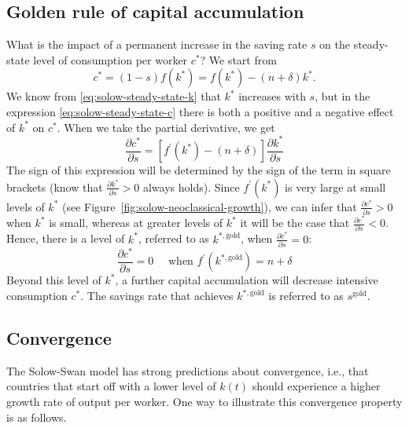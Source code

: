 \documentclass[\topdir/lecture\_notes.tex]{subfiles}
\begin{document}
\subsection{Golden rule of capital accumulation}
What is the impact of a permanent increase in the saving rate \(s\) on the steady-state level of consumption per worker \(c^{*}\)? We start from
\begin{equation}
  c^{*}=(1-s) f\left(k^{*}\right)=f\left(k^{*}\right)-(n+\delta) k^{*}. \label{eq:solow-steady-state-c}
\end{equation}
We know from \eqref{eq:solow-steady-state-k} that \(k^{*}\) increases with \(s\), but in the expression \eqref{eq:solow-steady-state-c} there is both a positive and a negative effect of \(k^{*}\) on \(c^{*}\).
When we take the partial derivative, we get
\begin{equation}
  \frac{\partial c^{*}}{\partial s}=\left[f^{\prime}\left(k^{*}\right)-(n+\delta)\right] \frac{\partial k^{*}}{\partial s} \label{eq:solow-c-derivative}
\end{equation}
The sign of this expression will be determined by the sign of the term in square brackets (know that \(\frac{\partial k^{*}}{\partial s}>0\) always holds).
Since \(f^{\prime}\left(k^{*}\right)\) is very large at small levels of \(k^{*}\) (see Figure~\ref{fig:solow-neoclassical-growth}), we can infer that \(\frac{\partial c^{*}}{\partial s}>0\) when \(k^{*}\) is small, whereas at greater levels of \(k^{*}\) it will be the case that \(\frac{\partial c^{*}}{\partial s}<0\).
Hence, there is a level of \(k^{*}\), referred to as \(k^{*, \text{gold}}\), when \(\frac{\partial c^{*}}{\partial s}=0\):
\begin{equation}
  \frac{\partial c^{*}}{\partial s}=0 \quad \text { when } f^{\prime}\left(k^{*, \text{gold}}\right)=n+\delta
  \label{eq:solow-golden-rule}
\end{equation}
Beyond this level of \(k^{*}\), a further capital accumulation will decrease intensive consumption \(c^{*}\).
The savings rate that achieves \(k^{*, \text{gold}}\) is referred to as \(s^{\text{gold}}\).

\subsection{Convergence}
The Solow-Swan model has strong predictions about convergence, i.e., that countries that start off with a lower level of \(k(t)\) should experience a higher growth rate of output per worker.
One way to illustrate this convergence property is as follows.
\end{document}
